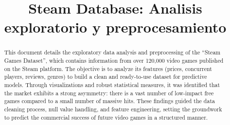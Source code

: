 \documentclass[conference]{IEEEtran}
\begin{document}
\title{Steam Database: Analisis exploratorio y preprocesamiento
}

\author{
  \and
  \and
  \and
}

\maketitle

\begin{abstract}
This document details the exploratory data analysis and preprocessing of the ``Steam Games Dataset'', which contains information from over 120,000 video games published on the Steam platform. The objective is to analyze its features (prices, concurrent players, reviews, genres) to build a clean and ready-to-use dataset for predictive models. Through visualizations and robust statistical measures, it was identified that the market exhibits a strong asymmetry: there is a vast number of low-impact free games compared to a small number of massive hits. These findings guided the data cleaning process, null value handling, and feature engineering, setting the groundwork to predict the commercial success of future video games in a structured manner.
\end{abstract}
\end{document}
